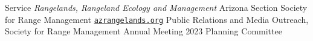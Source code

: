 \begin{rubric}{Service}
%
    \emph{Rangelands, Rangeland Ecology and Management}
%
    Arizona Section Society for Range Management {\faGlobe}{\href{https://azrangelands.org/}{\texttt{azrangelands.org}}}
%
    Public Relations and Media Outreach, Society for Range Management Annual Meeting 2023 Planning Committee
%
\end{rubric}